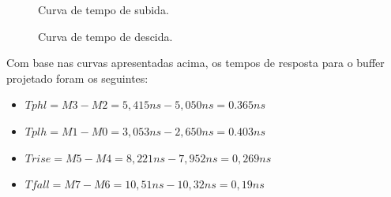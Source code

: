 \documentclass[a4paper,10pt] {article}
\begin{document}
\begin{figure} [h]
	\begin{minipage} [b] {0.48 \linewidth}
		\label{fig:rise}
		\centering
		\caption{Curva de tempo de subida.}
	\end{minipage}
	\begin{minipage} [b] {0.48 \linewidth}
		\label{fig:fall}
		\centering
		\caption{Curva de tempo de descida.}
	\end{minipage}
\end{figure}

Com base nas curvas apresentadas acima, os tempos de resposta para o buffer projetado foram os seguintes:

\begin{itemize}
\item $Tphl=M3-M2=5,415ns-5,050ns=0.365ns$
\item $Tplh=M1-M0=3,053ns-2,650ns=0.403ns$
\item $Trise=M5-M4=8,221ns-7,952ns=0,269ns$
\item $Tfall=M7-M6=10,51ns-10,32ns=0,19ns$
\end{itemize}
\end{document}
